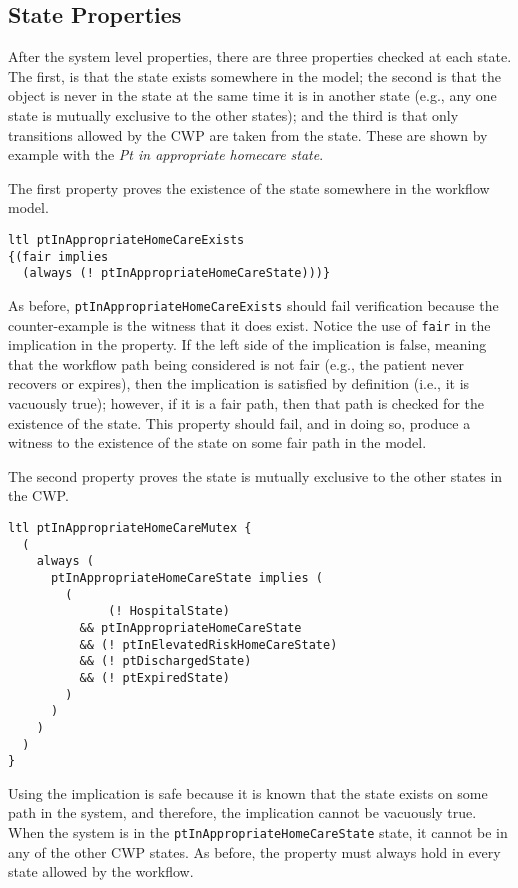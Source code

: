 \subsection{State Properties}
After the system level properties, there are three properties checked at each state. The first, is that the state exists somewhere in the model; the second is that the object is never in the state at the same time it is in another state (e.g., any one state is mutually exclusive to the other states); and the third is that only transitions allowed by the CWP are taken from the state. These are shown by example with the \emph{Pt in appropriate homecare state}.

The first property proves the existence of the state somewhere in the workflow model.
%
{\small
\begin{lstlisting}[style=myPromela]
ltl ptInAppropriateHomeCareExists 
{(fair implies 
  (always (! ptInAppropriateHomeCareState)))}
\end{lstlisting}
}
%
\noindent As before, \texttt{ptInAppropriateHomeCareExists} should fail verification because the counter-example is the witness that it does exist. Notice the use of \texttt{fair} in the implication in the property. If the left side of the implication is false, meaning that the workflow path being considered is not fair (e.g., the patient never recovers or expires), then the implication is satisfied by definition (i.e., it is vacuously true); however, if it is a fair path, then that path is checked for the existence of the state. This property should fail, and in doing so, produce a witness to the existence of the state on some fair path in the model.

The second property proves the state is mutually exclusive to the other states in the CWP.
%
{\small
\begin{lstlisting}[style=myPromela]
ltl ptInAppropriateHomeCareMutex {
  ( 
    always (
      ptInAppropriateHomeCareState implies (
        (
              (! HospitalState)
          && ptInAppropriateHomeCareState
          && (! ptInElevatedRiskHomeCareState)
          && (! ptDischargedState)
          && (! ptExpiredState)
        )
      )
    )
  )
}
\end{lstlisting}
}
%
\noindent Using the implication is safe because it is known that the state exists on some path in the system, and therefore, the implication cannot be vacuously true. When the system is in the \texttt{ptInAppropriateHomeCareState} state, it cannot be in any of the other CWP states. As before, the property must always hold in every state allowed by the workflow.

